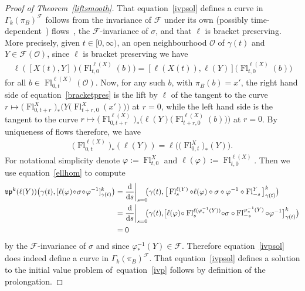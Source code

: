 \documentclass[10pt,a4paper]{amsart}
\numberwithin{equation}{section}
\def\Fl{\operatorname{Fl}}
\def\FF{{\mathcal{F}}}
\def\OO{{\mathcal{O}}}
\def\vpf{{\mathfrak{vp}}}
\begin{document}
\begin{proof}[Proof of Theorem~\ref{liftsmooth}]
That equation~\eqref{ivpsol} defines a curve in $\Gamma_{k}(\pi_{B})^{\FF}$ follows from the inva\-riance of $\FF$ under its own (possibly time-dependent~\cite[Lemma~3.3]{VilGar1}) flows~\cite[Proposition~1.6]{iakovos2}, the $\FF$-invariance of $\sigma$, and that $\ell$ is bracket preserving. More precisely, given $t\in[0,\infty)$, an open neighbourhood $\OO$ of $\gamma(t)$ and $Y\in\FF(\OO)$, since $\ell$ is bracket preserving we have
\begin{gather}\label{bracketpres}
\ell([X(t),Y])\big(\Fl^{\ell(X)}_{t,0}(b)\big) = [\ell(X(t)),\ell(Y)]\big(\Fl^{\ell(X)}_{t,0}(b)\big)
\end{gather}
for all $b\in\Fl^{\ell(X)}_{0,t}(\OO)$. Now, for any such $b$, with $\pi_{B}(b) = x'$, the right hand side of equation~\eqref{bracketpres} is the lift by $\ell$ of the tangent to the curve $r\mapsto\big(\Fl^{X}_{0,t+r}\big)_{*}\big(Y\big(\Fl_{t+r,0}^{X}(x')\big)\big)$ at $r = 0$,
while the left hand side is the tangent to the curve $r\mapsto \big(\Fl^{\ell(X)}_{0,t+r}\big)_{*}\big(\ell(Y)\big(\Fl^{\ell(X)}_{t+r,0}(b)\big)\big)$ at $r=0$. By uniqueness of flows therefore, we have
\begin{gather}\label{ellhom}
\big(\Fl^{\ell(X)}_{0,t}\big)_{*}(\ell(Y)) = \ell\big(\big(\Fl^{X}_{0,t}\big)_{*}(Y)\big).
\end{gather}
For notational simplicity denote $\varphi:=\Fl^{X}_{t,0}$ and $\ell(\varphi):=\Fl^{\ell(X)}_{t,0}$. Then we use equation~\eqref{ellhom} to compute
\begin{align*}
\vpf^{k}(\ell(Y))\big(\gamma(t),[\ell(\varphi)\!\circ\!\sigma\!\circ\!\varphi^{-1}]^{k}_{\gamma(t)}\big)
&= \frac{\rm d}{{\rm d}s}\bigg|_{s=0}\!\!\big(\gamma(t),\big[\Fl^{\ell(Y)}_{s}\circ\ell(\varphi) \circ\sigma\circ\varphi^{-1}\circ\Fl^{Y}_{-s}\big]^{k}_{\gamma(t)}\big)
\\
&= \frac{\rm d}{{\rm d}s}\bigg|_{s=0}\!\!\big(\gamma(t),\!\big[\ell(\varphi) \!\circ\Fl^{\ell(\varphi^{-1}_{*}(Y))}_{s}\! \circ\sigma\circ\Fl^{\varphi^{-1}_{*}(Y)}_{-s} \circ\varphi^{-1}\big]^{k}_{\gamma(t)}\big)
\\
&= 0
\end{align*}
by the $\FF$-invariance of $\sigma$ and since $\varphi^{-1}_{*}(Y)\in\FF$. Therefore equation~\eqref{ivpsol} does indeed define a curve in $\Gamma_{k}(\pi_{B})^{\FF}$. That equation~\eqref{ivpsol} defines a solution to the initial value problem of~equation~\eqref{ivp} follows by definition of the prolongation.


\end{proof}
\end{document}
